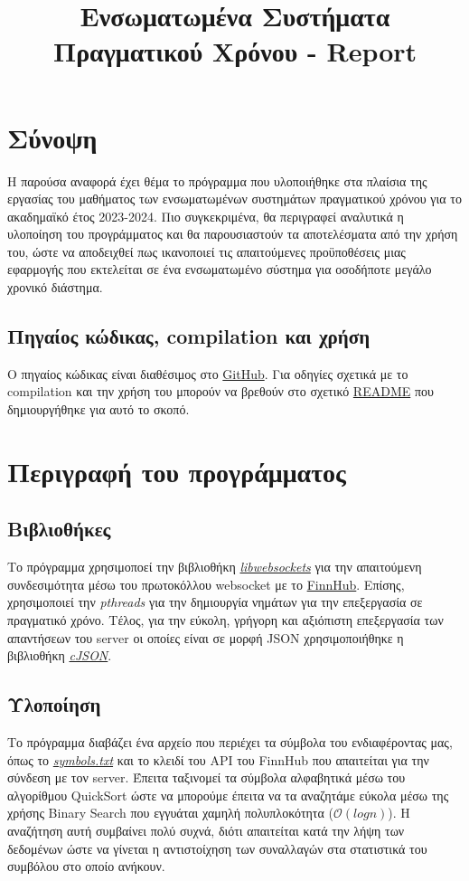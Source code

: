\documentclass[11pt]{article}
\date{}
\title{Ενσωματωμένα Συστήματα Πραγματικού Χρόνου - Report}
\begin{document}
\maketitle
\section{Σύνοψη}
\label{sec:org2558561}
Η παρούσα αναφορά έχει θέμα το πρόγραμμα που υλοποιήθηκε στα πλαίσια της εργασίας του μαθήματος των ενσωματωμένων συστημάτων πραγματικού χρόνου για το ακαδημαϊκό έτος 2023-2024. Πιο συγκεκριμένα, θα περιγραφεί αναλυτικά η υλοποίηση του προγράμματος και θα παρουσιαστούν τα αποτελέσματα από την χρήση του, ώστε να αποδειχθεί πως ικανοποιεί τις απαιτούμενες προϋποθέσεις μιας εφαρμογής που εκτελείται σε ένα ενσωματωμένο σύστημα για οσοδήποτε μεγάλο χρονικό διάστημα.
\subsection{Πηγαίος κώδικας, compilation και χρήση}
\label{sec:org059698b}
Ο πηγαίος κώδικας είναι διαθέσιμος στο \href{https://github.com/thetonk/tradestats}{GitHub}. Για οδηγίες σχετικά με το compilation και την χρήση του μπορούν να βρεθούν στο σχετικό \href{https://github.com/thetonk/tradestats/blob/main/README.md}{README} που δημιουργήθηκε για αυτό το σκοπό.
\section{Περιγραφή του προγράμματος}
\label{sec:org76b782d}
\subsection{Βιβλιοθήκες}
\label{sec:org99f6e15}
Το πρόγραμμα χρησιμοποεί την βιβλιοθήκη \href{https://libwebsockets.org/}{\emph{libwebsockets}} για την απαιτούμενη συνδεσιμότητα μέσω του πρωτοκόλλου websocket με το \href{https://finnhub.io}{FinnHub}. Επίσης, χρησιμοποιεί την \emph{pthreads} για την δημιουργία νημάτων για την επεξεργασία σε πραγματικό χρόνο. Τέλος, για την εύκολη, γρήγορη και αξιόπιστη επεξεργασία των απαντήσεων του server οι οποίες είναι σε μορφή JSON\autocite{sites:finnhub-api} χρησιμοποιήθηκε η βιβλιοθήκη \href{https://github.com/DaveGamble/cJSON}{\emph{cJSON}}.
\subsection{Υλοποίηση}
\label{sec:org91b9165}
Το πρόγραμμα διαβάζει ένα αρχείο που περιέχει τα σύμβολα του ενδιαφέροντας μας, όπως το \emph{\href{https://github.com/thetonk/tradestats/blob/main/symbols.txt}{symbols.txt}} και το κλειδί του API του FinnHub που απαιτείται για την σύνδεση με τον server. Έπειτα ταξινομεί τα σύμβολα αλφαβητικά μέσω του αλγορίθμου QuickSort\autocite{enwiki:1241885213} ώστε να μπορούμε έπειτα να τα αναζητάμε εύκολα μέσω της χρήσης Binary Search που εγγυάται χαμηλή πολυπλοκότητα (\(\mathcal{O}(logn)\))\autocite{enwiki:1242941867}. Η αναζήτηση αυτή συμβαίνει πολύ συχνά, διότι απαιτείται κατά την λήψη των δεδομένων ώστε να γίνεται η αντιστοίχηση των συναλλαγών στα στατιστικά του συμβόλου στο οποίο ανήκουν.\\
\end{document}
